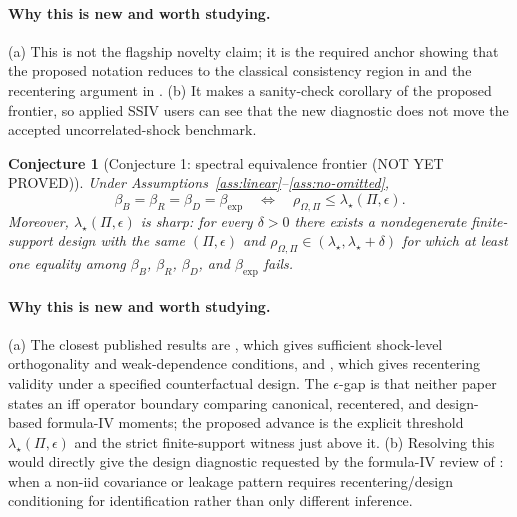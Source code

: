 \documentclass[11pt]{article}
\theoremstyle{definition}
\theoremstyle{plain}
\newtheorem{conjecture}{Conjecture}
\theoremstyle{remark}
\begin{document}
\paragraph{Why this is new and worth studying.}
(a) This is not the flagship novelty claim; it is the required anchor showing that the proposed notation reduces to the classical consistency region in \citet{BorusyakHullJaravel2022REStud} and the recentering argument in \citet{BorusyakHull2023Econometrica}.  (b) It makes \citet{BorusyakHullJaravel2022REStud} a sanity-check corollary of the proposed frontier, so applied SSIV users can see that the new diagnostic does not move the accepted uncorrelated-shock benchmark.

\begin{conjecture}[Conjecture 1: spectral equivalence frontier (NOT YET PROVED)]\label{conj:spectral-frontier}
Under Assumptions~\ref{ass:linear}--\ref{ass:no-omitted},
\[
\beta_B=\beta_R=\beta_D=\beta_{\exp}
\quad\Longleftrightarrow\quad
\rho_{\Omega,\Pi}\leq \lambda_\star(\Pi,\epsilon).
\]
Moreover, $\lambda_\star(\Pi,\epsilon)$ is sharp: for every $\delta>0$ there exists a nondegenerate finite-support design with the same $(\Pi,\epsilon)$ and $\rho_{\Omega,\Pi}\in(\lambda_\star,\lambda_\star+\delta)$ for which at least one equality among $\beta_B$, $\beta_R$, $\beta_D$, and $\beta_{\exp}$ fails.
\end{conjecture}
\paragraph{Why this is new and worth studying.}
(a) The closest published results are \citet{BorusyakHullJaravel2022REStud}, which gives sufficient shock-level orthogonality and weak-dependence conditions, and \citet{BorusyakHull2023Econometrica}, which gives recentering validity under a specified counterfactual design.  The $\epsilon$-gap is that neither paper states an iff operator boundary comparing canonical, recentered, and design-based formula-IV moments; the proposed advance is the explicit threshold $\lambda_\star(\Pi,\epsilon)$ and the strict finite-support witness just above it.  (b) Resolving this would directly give the design diagnostic requested by the formula-IV review of \citet{BorusyakHullJaravel2025ECTJ}: when a non-iid covariance or leakage pattern requires recentering/design conditioning for identification rather than only different inference.
\end{document}
